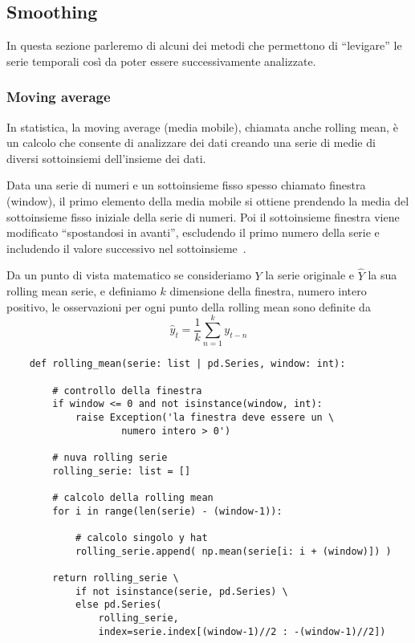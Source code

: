 \subsection{Smoothing}
In questa sezione parleremo di alcuni dei metodi che permettono di ``levigare''
le serie temporali così da poter essere successivamente analizzate.   


\subsubsection{Moving average}
In statistica, la moving average (media mobile), chiamata anche rolling mean,
è un calcolo che consente di analizzare dei dati creando una serie di 
medie di diversi sottoinsiemi dell'insieme dei dati.

Data una serie di numeri e un sottoinsieme fisso spesso chiamato finestra (window), 
il primo elemento della media mobile si ottiene prendendo la media del sottoinsieme 
fisso iniziale della serie di numeri. 
Poi il sottoinsieme finestra viene modificato ``spostandosi in avanti'', escludendo 
il primo numero della serie e includendo il valore successivo nel sottoinsieme~\cite{wiki:roll_mean}.

Da un punto di vista matematico se consideriamo $Y$ la serie originale e $\hat{Y}$ la sua 
rolling mean serie, e definiamo $k$ dimensione della finestra, numero intero positivo, le
osservazioni per ogni punto della rolling mean sono definite da
\[ \hat{y}_t = \frac{1}{k}\sum_{n = 1}^{k} y_{t-n}  \]

\begin{verbatim}
    def rolling_mean(serie: list | pd.Series, window: int):

        # controllo della finestra
        if window <= 0 and not isinstance(window, int):
            raise Exception('la finestra deve essere un \
                    numero intero > 0')

        # nuva rolling serie
        rolling_serie: list = []

        # calcolo della rolling mean
        for i in range(len(serie) - (window-1)):

            # calcolo singolo y hat
            rolling_serie.append( np.mean(serie[i: i + (window)]) )

        return rolling_serie \
            if not isinstance(serie, pd.Series) \
            else pd.Series(
                rolling_serie, 
                index=serie.index[(window-1)//2 : -(window-1)//2])
\end{verbatim}

